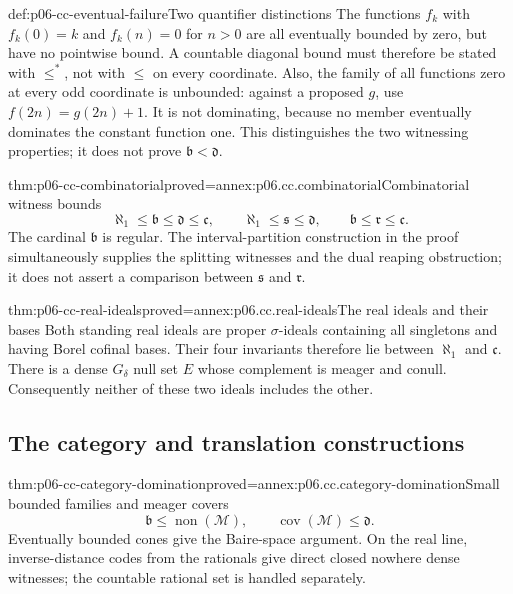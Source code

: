 \begin{hbexample}{def:p06-cc-eventual-failure}{Two quantifier distinctions}
The functions \(f_k\) with \(f_k(0)=k\) and \(f_k(n)=0\) for
\(n>0\) are all eventually bounded by zero, but have no pointwise
bound. A countable diagonal bound must therefore be stated with
\(\leq^*\), not with \(\leq\) on every coordinate.
Also, the family of all functions zero at every odd coordinate is
unbounded: against a proposed \(g\), use \(f(2n)=g(2n)+1\).
It is not dominating, because no member eventually dominates the
constant function one. This distinguishes the two witnessing properties;
it does not prove \(\mathfrak b<\mathfrak d\).
\end{hbexample}

\begin{hbtheorem}{thm:p06-cc-combinatorial}{proved=annex:p06.cc.combinatorial}{Combinatorial witness bounds}
\[
\aleph_1\leq\mathfrak b\leq\mathfrak d\leq\mathfrak c,
\qquad
\aleph_1\leq\mathfrak s\leq\mathfrak d,
\qquad
\mathfrak b\leq\mathfrak r\leq\mathfrak c.
\]
The cardinal \(\mathfrak b\) is regular. The interval-partition construction
in the proof simultaneously supplies the splitting witnesses and the
dual reaping obstruction; it does not assert a comparison between
\(\mathfrak s\) and \(\mathfrak r\).
\end{hbtheorem}

\begin{hbtheorem}{thm:p06-cc-real-ideals}{proved=annex:p06.cc.real-ideals}{The real ideals and their bases}
Both standing real ideals are proper \(\sigma\)-ideals containing all
singletons and having Borel cofinal bases. Their four invariants therefore
lie between \(\aleph_1\) and \(\mathfrak c\).
There is a dense \(G_\delta\) null set \(E\) whose complement is meager
and conull. Consequently neither of these two ideals includes the other.
\end{hbtheorem}

\subsection{The category and translation constructions}

\begin{hbtheorem}{thm:p06-cc-category-domination}{proved=annex:p06.cc.category-domination}{Small bounded families and meager covers}
\[
\mathfrak b\leq\operatorname{non}(\mathcal M),
\qquad
\operatorname{cov}(\mathcal M)\leq\mathfrak d.
\]
Eventually bounded cones give the Baire-space argument. On the real line,
inverse-distance codes from the rationals give direct closed nowhere dense
witnesses; the countable rational set is handled separately.
\end{hbtheorem}

